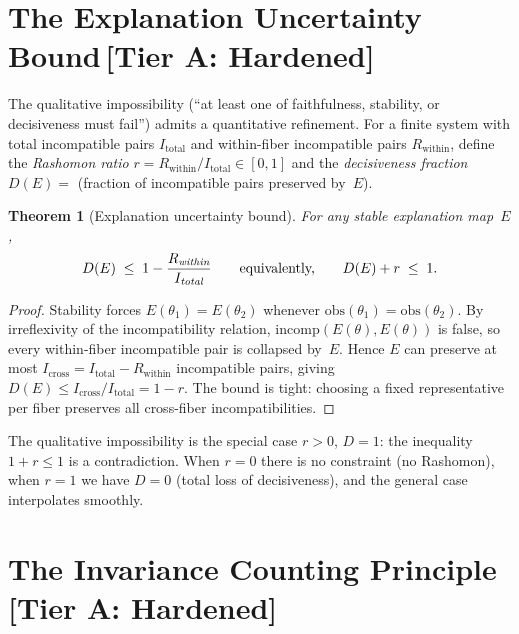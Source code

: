\documentclass[11pt,a4paper]{article}
\newtheorem{theorem}{Theorem}[section]
\begin{document}
\section{The Explanation Uncertainty Bound\,\textnormal{\normalsize[Tier A: Hardened]}}
\label{sec:bridge-uncertainty}

The qualitative impossibility (``at least one of faithfulness, stability, or
decisiveness must fail'') admits a quantitative refinement.  For a finite
system with total incompatible pairs $I_{\text{total}}$ and within-fiber
incompatible pairs $R_{\text{within}}$, define the \emph{Rashomon ratio}
$r = R_{\text{within}} / I_{\text{total}} \in [0,1]$ and the
\emph{decisiveness fraction} $D(E) = $ (fraction of incompatible pairs
preserved by~$E$).

\begin{theorem}[Explanation uncertainty bound]
\label{thm:uncertainty-principle}
For any stable explanation map~$E$,
\[
  D(E) \;\leq\; 1 - \frac{R_{\emph{within}}}{I_{\emph{total}}}
  \qquad\text{equivalently,}\qquad D(E) + r \;\leq\; 1.
\]
\end{theorem}

\begin{proof}
Stability forces $E(\theta_1) = E(\theta_2)$ whenever
$\mathrm{obs}(\theta_1) = \mathrm{obs}(\theta_2)$.  By irreflexivity of the
incompatibility relation, $\mathrm{incomp}(E(\theta), E(\theta))$ is false,
so every within-fiber incompatible pair is collapsed by~$E$.  Hence $E$ can
preserve at most $I_{\text{cross}} = I_{\text{total}} - R_{\text{within}}$
incompatible pairs, giving $D(E) \leq I_{\text{cross}} / I_{\text{total}} =
1 - r$.  The bound is tight: choosing a fixed representative per fiber
preserves all cross-fiber incompatibilities.
\end{proof}

The qualitative impossibility is the special case $r > 0$, $D = 1$: the
inequality $1 + r \leq 1$ is a contradiction.  When $r = 0$ there is no
constraint (no Rashomon), when $r = 1$ we have $D = 0$ (total loss of
decisiveness), and the general case interpolates smoothly.

\section{The Invariance Counting Principle\,\textnormal{\normalsize[Tier A: Hardened]}}
\label{sec:bridge-noether}
\end{document}
